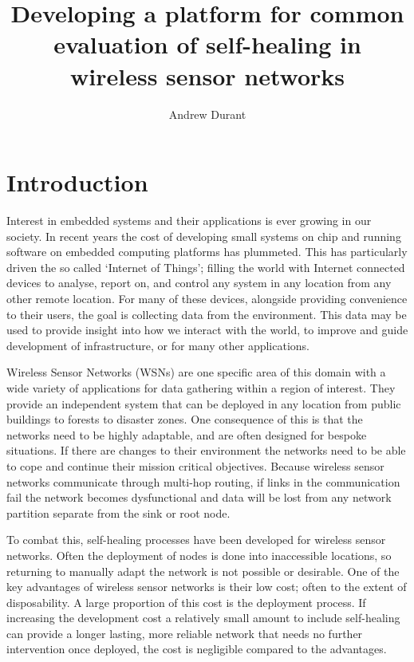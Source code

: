 \documentclass[authoryearcitations]{UoYCSproject}
\author{Andrew Durant}
\title{Developing a platform for common evaluation of self-healing in wireless sensor networks}
\begin{document}
\maketitle
\listoffigures
\listoftables
\renewcommand{\lstlistlistingname}{List of Listings}
\lstlistoflistings

\chapter{Introduction}
\label{cha:Introduction}

Interest in embedded systems and their applications is ever growing in our society. In recent years the cost of developing small systems on chip and running software on embedded computing platforms has plummeted. This has particularly driven the so called `Internet of Things'; filling the world with Internet connected devices to analyse, report on, and control any system in any location from any other remote location. For many of these devices, alongside providing convenience to their users, the goal is collecting data from the environment. This data may be used to provide insight into how we interact with the world, to improve and guide development of infrastructure, or for many other applications.

Wireless Sensor Networks (WSNs) are one specific area of this domain with a wide variety of applications for data gathering within a region of interest. They provide an independent system that can be deployed in any location from public buildings to forests to disaster zones. One consequence of this is that the networks need to be highly adaptable, and are often designed for bespoke situations. If there are changes to their environment the networks need to be able to cope and continue their mission critical objectives. Because wireless sensor networks communicate through multi-hop routing, if links in the communication fail the network becomes dysfunctional and data will be lost from any network partition separate from the sink or root node.

To combat this, self-healing processes have been developed for wireless sensor networks. Often the deployment of nodes is done into inaccessible locations, so returning to manually adapt the network is not possible or desirable. One of the key advantages of wireless sensor networks is their low cost; often to the extent of disposability. A large proportion of this cost is the deployment process. If increasing the development cost a relatively small amount to include self-healing can provide a longer lasting, more reliable network that needs no further intervention once deployed, the cost is negligible compared to the advantages.
\end{document}
